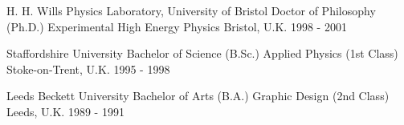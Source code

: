 

\begin{cventries}

    \award
    {H. H. Wills Physics Laboratory, University of Bristol} %
    {Doctor of Philosophy (Ph.D.) Experimental High Energy Physics} %
    {Bristol, U.K.} %
    {1998 - 2001} %
    {}

    \award
    {Staffordshire University} %
    {Bachelor of Science (B.Sc.) Applied Physics (1st Class)} %
    {Stoke-on-Trent, U.K.} %
    {1995 - 1998} %
    {}

    \award
    {Leeds Beckett University} %
    {Bachelor of Arts (B.A.) Graphic Design (2nd Class)} %
    {Leeds, U.K.} %
    {1989 - 1991} %
    {}

\end{cventries}